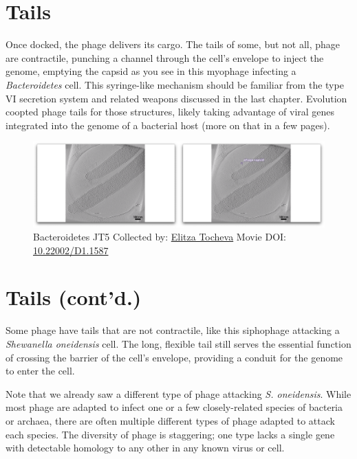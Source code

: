 \documentclass[]{tufte-book}
\begin{document}
\section{Tails}\label{tails}

Once docked, the phage delivers its cargo. The tails of some, but not
all, phage are contractile, punching a channel through the cell's
envelope to inject the genome, emptying the capsid as you see in this
myophage infecting a \emph{Bacteroidetes} cell. This syringe-like
mechanism should be familiar from the type VI secretion system and
related weapons discussed in the last chapter. Evolution coopted phage
tails for those structures, likely taking advantage of viral genes
integrated into the genome of a bacterial host (more on that in a few
pages).





\begin{figure}
\includegraphics{movie_stills/10_2} \caption[Bacteroidetes JT5 Collected by:
\protect\hyperlink{elitza_tocheva}{Elitza Tocheva} Movie DOI:
\href{https://doi.org/10.22002/D1.1587}{10.22002/D1.1587}]{Bacteroidetes JT5 Collected by:
\protect\hyperlink{elitza_tocheva}{Elitza Tocheva} Movie DOI:
\href{https://doi.org/10.22002/D1.1587}{10.22002/D1.1587}}\label{fig:10-2}
\end{figure}

\section{Tails (cont'd.)}\label{tails-contd.}

Some phage have tails that are not contractile, like this siphophage
attacking a \emph{Shewanella oneidensis} cell. The long, flexible tail
still serves the essential function of crossing the barrier of the
cell's envelope, providing a conduit for the genome to enter the cell.

Note that we already saw a different type of phage attacking \emph{S.
oneidensis}. While most phage are adapted to infect one or a few
closely-related species of bacteria or archaea, there are often multiple
different types of phage adapted to attack each species. The diversity
of phage is staggering; one type lacks a single gene with detectable
homology to any other in any known virus or cell.
\end{document}
